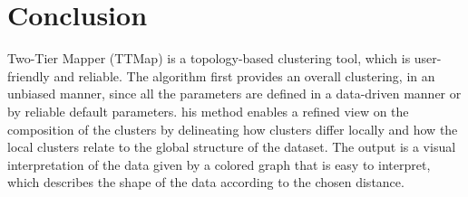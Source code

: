 \documentclass[a4paper,12pt]{article}
\begin{document}
%
\section{Conclusion}
Two-Tier Mapper (TTMap) is a topology-based clustering tool, which is user-friendly and reliable. The algorithm first provides an overall clustering, in an unbiased manner, since all the parameters are defined in a data-driven manner or by reliable default parameters. his method enables a refined view on the composition of the clusters by delineating
 how clusters differ locally and how the local clusters relate to the global structure of the dataset. The output is a visual interpretation of the data given by a colored graph that is easy to interpret, which describes the shape of the data according to the chosen distance.
 

%
\end{document}
